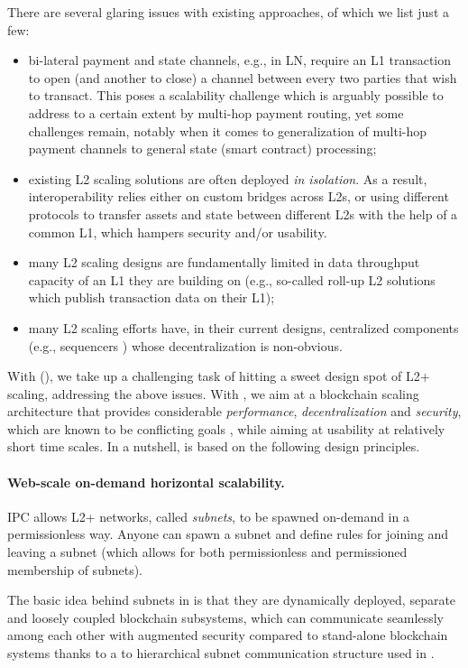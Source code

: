 There are several glaring issues with existing approaches, of which we list just a few:
\begin{itemize}
\item bi-lateral payment and state channels, e.g., in LN, require an L1 transaction to open (and another to close) a channel between every two parties that wish to transact. This poses a scalability challenge which is arguably possible to address to a certain extent by multi-hop payment routing, yet some challenges remain, notably when it comes to generalization of multi-hop payment channels to general state (smart contract) processing;
\item existing L2 scaling solutions are often deployed \emph{in isolation}. As a result, interoperability relies either on custom bridges across L2s, or using different protocols to transfer assets and state between different L2s with the help of a common L1, which hampers security and/or usability. 
\item many L2 scaling designs are fundamentally limited in data throughput capacity of an L1 they are building on (e.g., so-called roll-up L2 solutions which publish transaction data on their L1); 
\item many L2 scaling efforts have, in their current designs, centralized components (e.g., sequencers \cite{thibault2022rollups}) whose decentralization is non-obvious. 
\end{itemize}

With \ipcFull (\ipc), we take up a challenging task of hitting a sweet design spot of L2+ scaling, addressing the above issues. With \ipc, we aim at a blockchain scaling architecture that provides considerable \emph{performance}, \emph{decentralization} and \emph{security}, which are known to be conflicting goals \cite{vitalik2021trilemma}, while aiming at usability at relatively short time scales. In a nutshell, \ipc is based on the following design principles. 

\paragraph{Web-scale on-demand horizontal scalability.} IPC allows L2+ networks, called \emph{\glspl{subnet}}, to be spawned on-demand in a permissionless way. Anyone can spawn a subnet and define rules for joining and leaving a subnet (which allows for both permissionless and permissioned \gls{membership} of subnets). 

The basic idea behind subnets in \ipc is that they are dynamically deployed,  separate and loosely coupled blockchain subsystems, which can communicate seamlessly among each other with augmented security compared to stand-alone blockchain systems thanks to a to hierarchical subnet communication structure used in \ipc. 

